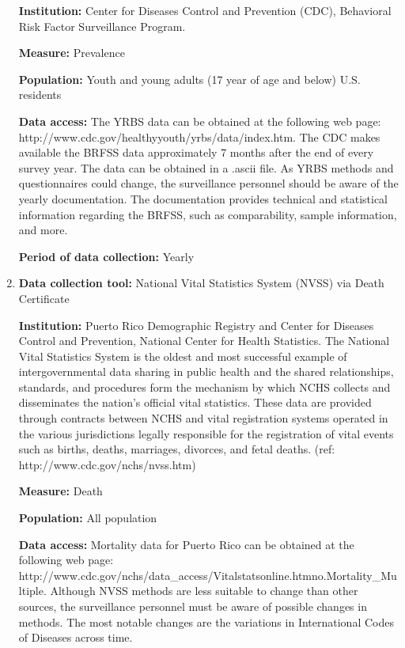 \documentclass[12pt,letterpaper]{report}
\begin{document}
\begin{enumerate}
	\textbf{Institution:} Center for Diseases Control and Prevention (CDC), Behavioral Risk Factor Surveillance Program.

	\textbf{Measure:} Prevalence

	\textbf{Population:} Youth and young adults (17 year of age and below) U.S. residents

	\textbf{Data access:} The YRBS data can be obtained at the following web page:\\
	http://www.cdc.gov/healthyyouth/yrbs/data/index.htm. The CDC makes available the BRFSS data approximately 7 months after the end of every survey year. The data can be obtained in a .ascii file. As YRBS methods and questionnaires could change, the surveillance personnel should be aware of the yearly documentation. The documentation provides technical and statistical information regarding the BRFSS, such as comparability, sample information, and more.

	\textbf{Period of data collection:}  Yearly

\item \textbf{Data collection tool:} National Vital Statistics System (NVSS) via Death Certificate

	\textbf{Institution:} Puerto Rico Demographic Registry and Center for Diseases Control and Prevention, National Center for Health Statistics. The National Vital Statistics System is the oldest and most successful example of intergovernmental data sharing in public health and the shared relationships, standards, and procedures form the mechanism by which NCHS collects and disseminates the nation's official vital statistics. 
These data are provided through contracts between NCHS and vital registration systems operated in the various jurisdictions legally responsible for the registration of vital events such as births, deaths, marriages, divorces, and fetal deaths. (ref: http://www.cdc.gov/nchs/nvss.htm)

	\textbf{Measure:} Death

	\textbf{Population:} All population

	\textbf{Data access:} Mortality data for Puerto Rico can be obtained at the following web page:
http://www.cdc.gov/nchs/data\_access/Vitalstatsonline.htmno.Mortality\_Multiple.
 Although NVSS methods are less suitable to change than other sources, the surveillance personnel must be aware of possible changes in methods.  The most notable changes are the variations in International Codes of Diseases across time.


\end{enumerate}
\end{document}
